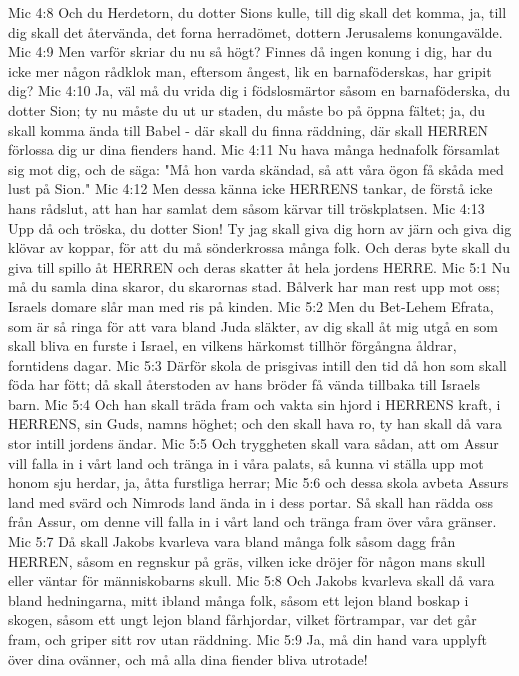 Mic 4:8  Och du Herdetorn, du dotter Sions kulle, till dig skall det komma, ja, till dig skall det återvända, det forna herradömet, dottern Jerusalems konungavälde.
Mic 4:9  Men varför skriar du nu så högt? Finnes då ingen konung i dig, har du icke mer någon rådklok man, eftersom ångest, lik en barnaföderskas, har gripit dig?
Mic 4:10  Ja, väl må du vrida dig i födslosmärtor såsom en barnaföderska, du dotter Sion; ty nu måste du ut ur staden, du måste bo på öppna fältet; ja, du skall komma ända till Babel - där skall du finna räddning, där skall HERREN förlossa dig ur dina fienders hand.
Mic 4:11  Nu hava många hednafolk församlat sig mot dig, och de säga: "Må hon varda skändad, så att våra ögon få skåda med lust på Sion."
Mic 4:12  Men dessa känna icke HERRENS tankar, de förstå icke hans rådslut, att han har samlat dem såsom kärvar till tröskplatsen.
Mic 4:13  Upp då och tröska, du dotter Sion! Ty jag skall giva dig horn av järn och giva dig klövar av koppar, för att du må sönderkrossa många folk. Och deras byte skall du giva till spillo åt HERREN och deras skatter åt hela jordens HERRE.
Mic 5:1  Nu må du samla dina skaror, du skarornas stad. Bålverk har man rest upp mot oss; Israels domare slår man med ris på kinden.
Mic 5:2  Men du Bet-Lehem Efrata, som är så ringa för att vara bland Juda släkter, av dig skall åt mig utgå en som skall bliva en furste i Israel, en vilkens härkomst tillhör förgångna åldrar, forntidens dagar.
Mic 5:3  Därför skola de prisgivas intill den tid då hon som skall föda har fött; då skall återstoden av hans bröder få vända tillbaka till Israels barn.
Mic 5:4  Och han skall träda fram och vakta sin hjord i HERRENS kraft, i HERRENS, sin Guds, namns höghet; och den skall hava ro, ty han skall då vara stor intill jordens ändar.
Mic 5:5  Och tryggheten skall vara sådan, att om Assur vill falla in i vårt land och tränga in i våra palats, så kunna vi ställa upp mot honom sju herdar, ja, åtta furstliga herrar;
Mic 5:6  och dessa skola avbeta Assurs land med svärd och Nimrods land ända in i dess portar. Så skall han rädda oss från Assur, om denne vill falla in i vårt land och tränga fram över våra gränser.
Mic 5:7  Då skall Jakobs kvarleva vara bland många folk såsom dagg från HERREN, såsom en regnskur på gräs, vilken icke dröjer för någon mans skull eller väntar för människobarns skull.
Mic 5:8  Och Jakobs kvarleva skall då vara bland hedningarna, mitt ibland många folk, såsom ett lejon bland boskap i skogen, såsom ett ungt lejon bland fårhjordar, vilket förtrampar, var det går fram, och griper sitt rov utan räddning.
Mic 5:9  Ja, må din hand vara upplyft över dina ovänner, och må alla dina fiender bliva utrotade!
